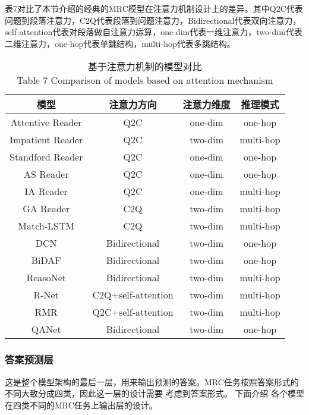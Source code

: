 表7对比了本节介绍的经典的MRC模型在注意力机制设计上的差异。其中Q2C代表问题到段落注意力，C2Q代表段落到问题注意力，Bidirectional代表双向注意力，self-attention代表对段落做自注意力运算，one-dim代表一维注意力，two-dim代表二维注意力，one-hop代表单跳结构，multi-hop代表多跳结构。
\begin{table}[ht]
	\centering
	\caption{基于注意力机制的模型对比 \\ Table 7 Comparison of models based on attention mechanism}
	\begin{tabular}{c c c c}
		\toprule
		模型&注意力方向&注意力维度&推理模式 \\
		\midrule
		Attentive Reader\upcite{Hermann}&Q2C&one-dim&one-hop \\
		\midrule
		Impatient Reader\upcite{Hermann}&Q2C&two-dim&multi-hop \\
		\midrule
		Standford Reader\upcite{AR}&Q2C&one-dim&one-hop \\
		\midrule
		AS Reader\upcite{ASR}&Q2C&one-dim&one-hop \\
		\midrule
		IA Reader\upcite{IAReader}&Q2C&one-dim&multi-hop \\
		\midrule
		GA Reader\upcite{GAReader}&C2Q&two-dim&multi-hop \\
		\midrule
		Match-LSTM\upcite{MatchLSTM}&C2Q&two-dim&multi-hop \\
		\midrule
		DCN\upcite{DCN}&Bidirectional&two-dim&one-hop \\           
		\midrule
		BiDAF\upcite{BiDAF}&Bidirectional&two-dim&one-hop \\
		\midrule
		ReasoNet\upcite{Reasonet}&Bidirectional&two-dim&multi-hop\\
		\midrule
		R-Net\upcite{RNet}&C2Q+self-attention&two-dim&multi-hop \\
		\midrule
		RMR\upcite{RMR}&Q2C+self-attention&two-dim&multi-hop \\
		\midrule
		QANet\upcite{QANet}&Bidirectional&two-dim&one-hop\\
		\bottomrule
	\end{tabular}
\end{table}



\subsubsection{答案预测层}
这是整个模型架构的最后一层，用来输出预测的答案。MRC任务按照答案形式的不同大致分成四类，因此这一层的设计需要
考虑到答案形式。
%
下面介绍
各个模型在四类不同的MRC任务上输出层的设计。


